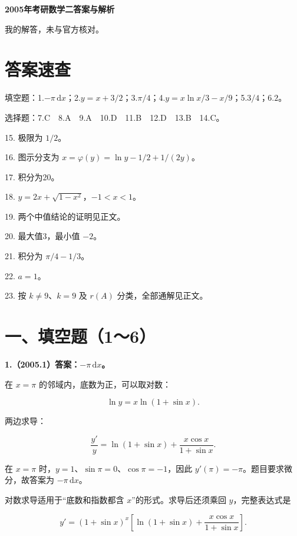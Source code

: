 \documentclass[UTF8,11pt,fontset=windows]{ctexart}
\begin{document}
{\LARGE\bfseries 2005年考研数学二答案与解析\par}\vspace{6pt}

\begingroup\color{gray}我的解答，未与官方核对。\par\endgroup

\section*{答案速查}

\begingroup\color{gray}填空题：1.$-\pi\,\mathrm dx$；2.$y=x+3/2$；3.$\pi/4$；4.$y=x\ln x/3-x/9$；5.$3/4$；6.$2$。\par\endgroup

\begingroup\color{gray}选择题：7.C　8.A　9.A　10.D　11.B　12.D　13.B　14.C。\par\endgroup

15. 极限为 $1/2$。

16. 图示分支为 $x=\varphi(y)=\ln y-1/2+1/(2y)$。

17. 积分为20。

18. $y=2x+\sqrt{1-x^2}$，$-1<x<1$。

19. 两个中值结论的证明见正文。

20. 最大值3，最小值 $-2$。

21. 积分为 $\pi/4-1/3$。

22. $a=1$。

23. 按 $k\ne9$、$k=9$ 及 $r(A)$ 分类，全部通解见正文。

\clearpage

\section*{一、填空题（1～6）}

\textbf{1.（2005.1）答案：$-\pi\,\mathrm dx$。}

在 $x=\pi$ 的邻域内，底数为正，可以取对数：

$$
\ln y=x\ln(1+\sin x).
$$

两边求导：

$$
\frac{y'}y=\ln(1+\sin x)+\frac{x\cos x}{1+\sin x}.
$$

在 $x=\pi$ 时，$y=1$、$\sin\pi=0$、$\cos\pi=-1$，因此 $y'(\pi)=-\pi$。题目要求微分，故答案为 $-\pi\,\mathrm dx$。

对数求导适用于“底数和指数都含 $x$”的形式。求导后还须乘回 $y$，完整表达式是

$$
y'=(1+\sin x)^x\left[\ln(1+\sin x)+\frac{x\cos x}{1+\sin x}\right].
$$
\end{document}
